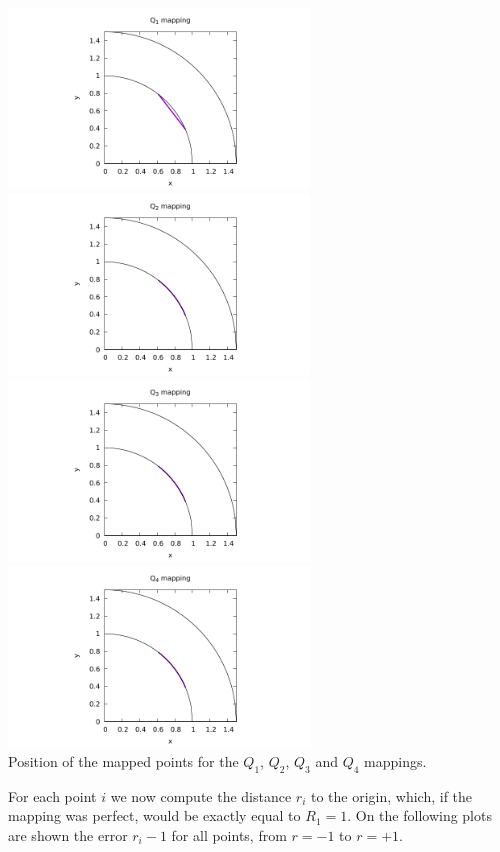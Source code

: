 \begin{center}
\includegraphics[width=8cm]{images/mappings/curved/xy1.pdf}
\includegraphics[width=8cm]{images/mappings/curved/xy2.pdf}\\
\includegraphics[width=8cm]{images/mappings/curved/xy3.pdf}
\includegraphics[width=8cm]{images/mappings/curved/xy4.pdf}\\
{\captionfont Position of the mapped points for the $Q_1$, $Q_2$, $Q_3$ and $Q_4$ mappings.}
\end{center}

For each point $i$ we now compute the distance $r_i$ 
to the origin, which, if the 
mapping was perfect, would be exactly equal to $R_1=1$. 
On the following plots are shown the error $r_i-1$ for all 
points, from $r=-1$ to $r=+1$.

